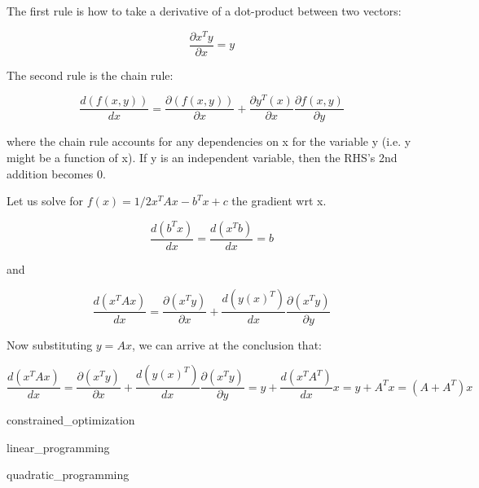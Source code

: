 \documentclass{article}
\theoremstyle{proposition}
\begin{document}
    The first rule is how to take a derivative of a dot-product between two vectors:

      $$\frac{\partial x^T y}{\partial x} = y$$

    The second rule is the chain rule:

      $$\frac{d(f(x,y))}{dx} = \frac{\partial (f(x,y))}{\partial x} + \frac{\partial y^T(x)}{\partial x} \frac{\partial f(x, y)}{\partial y}$$

    where the chain rule accounts for any dependencies on x for the variable y (i.e. y might be a function of x). If y is an independent variable, then the RHS's 2nd addition becomes 0.

    Let us solve for $f(x) = 1/2 x^T A x - b^T x + c$ the gradient wrt x.

      $$\dfrac{d(b^Tx)}{d x} = \dfrac{d (x^Tb)}{d x} = b$$

    and

      $$\dfrac{d (x^TAx)}{d x} = \dfrac{\partial (x^Ty)}{\partial x} +  \dfrac{d (y(x)^T)}{d x} \dfrac{\partial (x^Ty)}{\partial y}$$

    Now substituting $y = Ax$, we can arrive at the conclusion that:

      $$\dfrac{d (x^TAx)}{d x} = \dfrac{\partial (x^Ty)}{\partial x} +  \dfrac{d( y(x)^T)}{d x} \dfrac{\partial (x^Ty)}{\partial y} = y + \dfrac{d (x^TA^T)}{d x} x = y + A^Tx = (A+A^T)x$$

{constrained_optimization}

{linear_programming}

{quadratic_programming}
\end{document}
